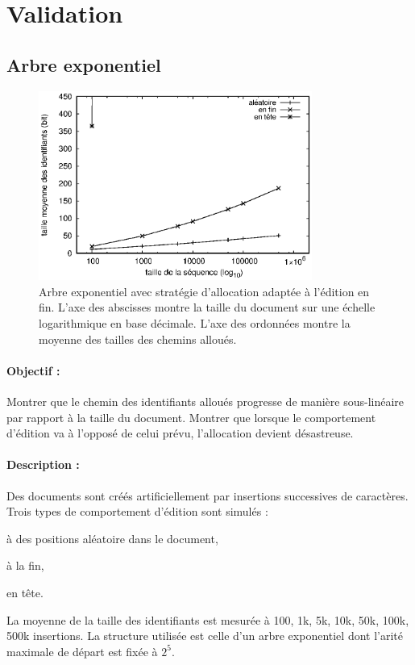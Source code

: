 
\section{Validation}
\label{repl:sec:validation}


\subsection{Arbre exponentiel}

\begin{figure}
  \centering
  \includegraphics[width=0.8\textwidth]{img/lseq/double.eps}
  \caption{\label{repl:img:exponentialtree} Arbre exponentiel avec stratégie
    d'allocation adaptée à l'édition en fin. L'axe des abscisses montre la
    taille du document sur une échelle logarithmique en base décimale. L'axe des
    ordonnées montre la moyenne des tailles des chemins alloués.}
\end{figure}

\paragraph{Objectif :} Montrer que le chemin des identifiants alloués progresse
de manière sous-linéaire par rapport à la taille du document. Montrer que
lorsque le comportement d'édition va à l'opposé de celui prévu, l'allocation
devient désastreuse.

\paragraph{Description :} Des documents sont créés artificiellement par
insertions successives de caractères. Trois types de comportement d'édition sont
simulés :
\begin{inparaenum}[(i)]
\item à des positions aléatoire dans le document,
\item à la fin,
\item en tête.
\end{inparaenum}
La moyenne de la taille des identifiants est mesurée à 100, 1k, 5k, 10k, 50k,
100k, 500k insertions. La structure utilisée est celle d'un arbre exponentiel
dont l'arité maximale de départ est fixée à $2^5$.

